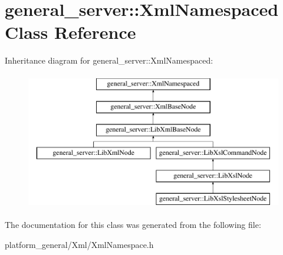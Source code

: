 \hypertarget{classgeneral__server_1_1XmlNamespaced}{\section{general\-\_\-server\-:\-:\-Xml\-Namespaced \-Class \-Reference}
\label{classgeneral__server_1_1XmlNamespaced}
}
\-Inheritance diagram for general\-\_\-server\-:\-:\-Xml\-Namespaced\-:\begin{figure}[H]
\begin{center}
\leavevmode
\includegraphics[height=6.000000cm]{classgeneral__server_1_1XmlNamespaced}
\end{center}
\end{figure}


\-The documentation for this class was generated from the following file\-:\begin{DoxyCompactItemize}
\item 
platform\-\_\-general/\-Xml/\-Xml\-Namespace.\-h\end{DoxyCompactItemize}
